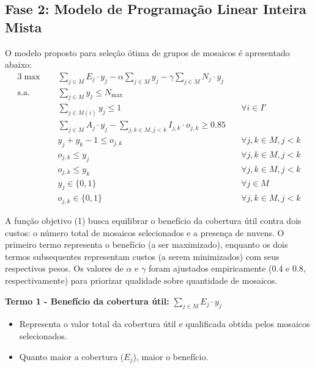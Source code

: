 \documentclass[a4paper,11pt]{article}
\begin{document}
\subsection{Fase 2: Modelo de Programação Linear Inteira Mista} \label{sec:fase2}
O modelo proposto para seleção ótima de grupos de mosaicos é apresentado abaixo:
\vspace{-1mm}
\begin{alignat}{3}
    \max \quad & \sum_{j \in M} E_j \cdot y_j - \alpha \sum_{j \in M} y_j - \gamma \sum_{j \in M} N_j \cdot y_j & \tag{1} \\
    \text{s.a.} \quad & \sum_{j \in M} y_j \leq N_{\max} & \tag{2} \\
    & \sum_{j \in M(i)} y_j \leq 1 & \quad \forall i \in I' \tag{3}\\
    & \sum_{j \in M} A_j \cdot y_j - \sum_{j, k \in M, j < k} I_{j,k} \cdot o_{j,k} \geq 0.85 & \tag{4} \\
    & y_j + y_k - 1 \leq o_{j,k} & \quad \forall j, k \in M, j < k \tag{5}\\
    & o_{j,k} \leq y_j & \quad \forall j, k \in M, j < k \tag{6}\\
    & o_{j,k} \leq y_k & \quad \forall j, k \in M, j < k \tag{7}\\
    & y_j \in \{0,1\} & \quad \forall j \in M \tag{8}\\
    & o_{j,k} \in \{0,1\} & \quad \forall j, k \in M, j < k \tag{9}
\end{alignat}

\vspace{-2mm}
A função objetivo (1) busca equilibrar o benefício da cobertura útil contra dois custos: o número total de mosaicos selecionados e a presença de nuvens. O primeiro termo representa o benefício (a ser maximizado), enquanto os dois termos subsequentes representam custos (a serem minimizados) com seus respectivos pesos. Os valores de $\alpha$ e $\gamma$ foram ajustados empiricamente (0.4 e 0.8, respectivamente) para priorizar qualidade sobre quantidade de mosaicos.

\textbf{Termo 1 - Benefício da cobertura útil:} $\sum_{j \in M} E_j \cdot y_j$
\begin{itemize}[noitemsep, topsep=0pt]
    \item Representa o valor total da cobertura útil e qualificada obtida pelos mosaicos selecionados.
    \item Quanto maior a cobertura ($E_j$), maior o benefício.
\end{itemize}
\end{document}
